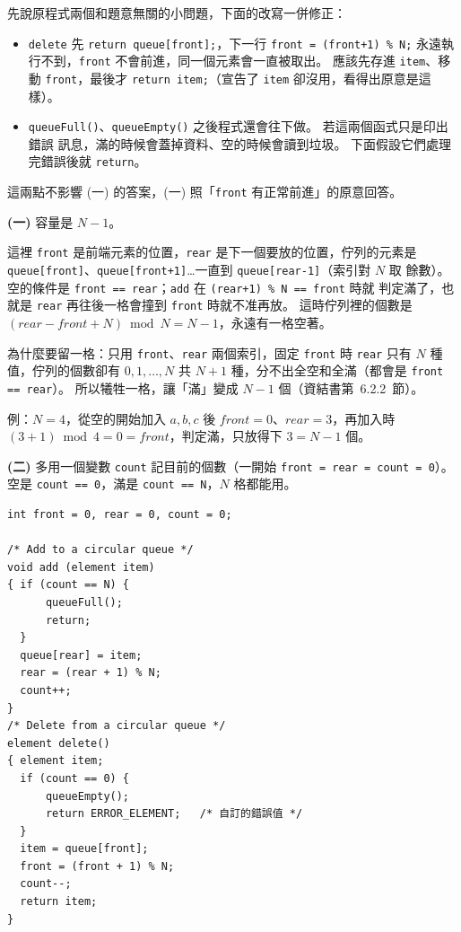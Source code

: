 \begin{pastsoln}
先說原程式兩個和題意無關的小問題，下面的改寫一併修正：
\begin{itemize}
\item \texttt{delete} 先 \texttt{return queue[front];}，下一行 \texttt{front = (front+1) \% N;}
永遠執行不到，\texttt{front} 不會前進，同一個元素會一直被取出。 應該先存進 \texttt{item}、移動
\texttt{front}，最後才 \texttt{return item;}（宣告了 \texttt{item} 卻沒用，看得出原意是這樣）。
\item \texttt{queueFull()}、\texttt{queueEmpty()} 之後程式還會往下做。 若這兩個函式只是印出錯誤
訊息，滿的時候會蓋掉資料、空的時候會讀到垃圾。 下面假設它們處理完錯誤後就 \texttt{return}。
\end{itemize}
這兩點不影響 (一) 的答案，(一) 照「\texttt{front} 有正常前進」的原意回答。

\textbf{(一)} 容量是 $N - 1$。

這裡 \texttt{front} 是前端元素的位置，\texttt{rear} 是下一個要放的位置，佇列的元素是
\texttt{queue[front]}、\texttt{queue[front+1]}…一直到 \texttt{queue[rear-1]}（索引對 $N$ 取
餘數）。 空的條件是 \texttt{front == rear}；\texttt{add} 在 \texttt{(rear+1) \% N == front} 時就
判定滿了，也就是 \texttt{rear} 再往後一格會撞到 \texttt{front} 時就不准再放。 這時佇列裡的個數是
$(\mathit{rear} - \mathit{front} + N) \bmod N = N - 1$，永遠有一格空著。

為什麼要留一格：只用 \texttt{front}、\texttt{rear} 兩個索引，固定 \texttt{front} 時 \texttt{rear}
只有 $N$ 種值，佇列的個數卻有 $0, 1, \ldots, N$ 共 $N + 1$ 種，分不出全空和全滿（都會是
\texttt{front == rear}）。 所以犧牲一格，讓「滿」變成 $N - 1$ 個（資結書第~6.2.2~節）。

例：$N = 4$，從空的開始加入 $a, b, c$ 後 $\mathit{front} = 0$、$\mathit{rear} = 3$，再加入時
$(3 + 1) \bmod 4 = 0 = \mathit{front}$，判定滿，只放得下 $3 = N - 1$ 個。

\textbf{(二)} 多用一個變數 \texttt{count} 記目前的個數（一開始 \texttt{front = rear = count = 0}）。
空是 \texttt{count == 0}，滿是 \texttt{count == N}，$N$ 格都能用。
\begin{verbatim}
int front = 0, rear = 0, count = 0;

/* Add to a circular queue */
void add (element item)
{ if (count == N) {
      queueFull();
      return;
  }
  queue[rear] = item;
  rear = (rear + 1) % N;
  count++;
}
/* Delete from a circular queue */
element delete()
{ element item;
  if (count == 0) {
      queueEmpty();
      return ERROR_ELEMENT;   /* 自訂的錯誤值 */
  }
  item = queue[front];
  front = (front + 1) % N;
  count--;
  return item;
}
\end{verbatim}


\end{pastsoln}
